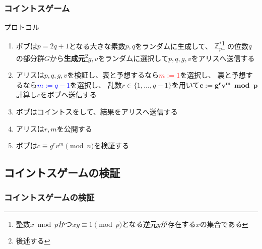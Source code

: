 \begin{frame}[fragile, label=protocol]
  \frametitle{コイントスゲーム}

  \begin{block}{プロトコル}
    \begin{enumerate}
      \item<2-> ボブは$p = 2q + 1$となる大きな素数$p, q$をランダムに生成して、
        $\mathbb{Z}^*_p$\footnote[frame]{整数$x \bmod p$かつ$xy \equiv 1 \pmod{p}$となる逆元$y$が存在する$x$の集合である}
        の位数$q$の部分群$G$から\textbf{生成元}\footnote[frame]{後述する}$g, v$をランダムに選択して$p, q, g, v$をアリスへ送信する
      \item<3-> アリスは$p, q, g, v$を検証し、表と予想するなら\textcolor{red}{$m := 1$}を選択し、
        裏と予想するなら\textcolor{blue}{$m := q - 1$}を選択し、
        乱数$r \in \{1, \dots, q - 1\}$を用いて$\mathbf{c := g^r v^m \bmod p}$計算し$c$をボブへ送信する
      \item<4-> ボブはコイントスをして、結果をアリスへ送信する
      \item<5-> アリスは$r, m$を公開する
      \item<6-> ボブは$c \equiv g^r v^m \pmod{n}$を検証する
    \end{enumerate}
  \end{block}
\end{frame}

\subsection{コイントスゲームの検証}
\begin{frame}[fragile, label=mdash]
  \frametitle{コイントスゲームの検証}
  
  \begin{center}



  \end{center}
\end{frame}

